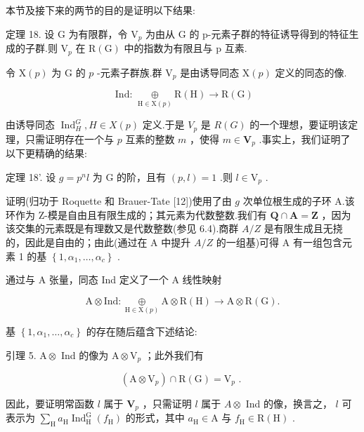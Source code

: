 \documentclass[10pt]{article}
\begin{document}
本节及接下来的两节的目的是证明以下结果:

定理 18. 设 \(\mathrm{G}\) 为有限群，令 \({\mathrm{V}}_{p}\) 为由从 \(\mathrm{G}\) 的 p-元素子群的特征诱导得到的特征生成的子群.则 \({\mathrm{V}}_{p}\) 在 \(\mathrm{R}\left( \mathrm{G}\right)\) 中的指数为有限且与 p 互素.

令 \(\mathrm{X}\left( p\right)\) 为 \(\mathrm{G}\) 的 \(p\) -元素子群族.群 \({\mathrm{V}}_{p}\) 是由诱导同态 \(\mathrm{X}\left( p\right)\) 定义的同态的像.

\[
\text{ Ind: }\mathop{\oplus }\limits_{{\mathrm{H} \in  \mathrm{X}\left( p\right) }}\mathrm{R}\left( \mathrm{H}\right)  \rightarrow  \mathrm{R}\left( \mathrm{G}\right)
\]

由诱导同态 \({\operatorname{Ind}}_{H}^{G},H \in  X\left( p\right)\) 定义.于是 \({V}_{p}\) 是 \(R\left( G\right)\) 的一个理想，要证明该定理，只需证明存在一个与 \(p\) 互素的整数 \(m\) ，使得 \(m \in  {\mathbf{V}}_{p}\) .事实上，我们证明了以下更精确的结果:

定理 18’. 设 \(g = {p}^{n}l\) 为 \(\mathrm{G}\) 的阶，且有 \(\left( {p,l}\right)  = 1\) .则 \(l \in  {\mathrm{V}}_{p}\) .

证明(归功于 Roquette 和 Brauer-Tate [12])使用了由 \(g\) 次单位根生成的子环 A.该环作为 Z-模是自由且有限生成的；其元素为代数整数.我们有 \(\mathbf{Q} \cap  \mathbf{A} = \mathbf{Z}\) ，因为该交集的元素既是有理数又是代数整数(参见 6.4).商群 \(A/Z\) 是有限生成且无挠的，因此是自由的；由此(通过在 A 中提升 \(A/Z\) 的一组基)可得 A 有一组包含元素 1 的基 \(\left\{  {1,{\alpha }_{1},\ldots ,{\alpha }_{c}}\right\}\) .

通过与 A 张量，同态 Ind 定义了一个 A 线性映射

\[
\mathrm{A} \otimes  \mathrm{{Ind}} : \underset{\mathrm{H} \in  \mathrm{X}\left( p\right) }{ \oplus  }\mathrm{A} \otimes  \mathrm{R}\left( \mathrm{H}\right)  \rightarrow  \mathrm{A} \otimes  \mathrm{R}\left( \mathrm{G}\right) .
\]

基 \(\left\{  {1,{\alpha }_{1},\ldots ,{\alpha }_{c}}\right\}\) 的存在随后蕴含下述结论:

引理 5. \(\mathrm{A} \otimes\) Ind 的像为 \(\mathrm{A} \otimes  {\mathrm{V}}_{p}\) ；此外我们有

\[
\left( {\mathrm{A} \otimes  {\mathrm{V}}_{p}}\right)  \cap  \mathrm{R}\left( \mathrm{G}\right)  = {\mathrm{V}}_{p}\text{ . }
\]

因此，要证明常函数 \(l\) 属于 \({\mathbf{V}}_{p}\) ，只需证明 \(l\) 属于 \(A \otimes\) Ind 的像，换言之， \(l\) 可表示为 \(\mathop{\sum }\limits_{\mathrm{H}}{a}_{\mathrm{H}}{\operatorname{Ind}}_{\mathrm{H}}^{\mathrm{G}}\left( {f}_{\mathrm{H}}\right)\) 的形式，其中 \({a}_{\mathrm{H}} \in  \mathrm{A}\) 与 \({f}_{\mathrm{H}} \in  \mathrm{R}\left( \mathrm{H}\right)\) .
\end{document}
